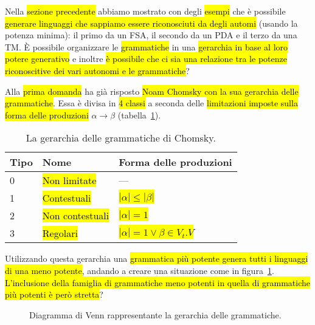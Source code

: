 \documentclass[a4paper,11pt,twoside]{article}
\theoremstyle{plain}
\theoremstyle{definition}
\theoremstyle{remark}
\begin{document}
Nella \hl{sezione precedente} abbiamo mostrato con degli \hl{esempi} che è
possibile \hl{generare linguaggi che sappiamo essere riconosciuti da degli
automi} (usando la potenza minima): il primo da un FSA, il secondo da un PDA e
il terzo da una TM\@. È possibile organizzare le \hl{grammatiche} in una
\hl{gerarchia in base al loro potere generativo} e inoltre \hl{è possibile che
ci sia una relazione tra le potenze riconoscitive dei vari autonomi e le
grammatiche}?

Alla \hl{prima domanda} ha già risposto \hl{Noam Chomsky con la sua gerarchia
delle grammatiche}. Essa è divisa in \hl{4 classi} a seconda delle
\hl{limitazioni imposte sulla forma delle produzioni} $\alpha \to \beta$
(tabella~\ref{tab:gerarchia-grammatiche}).

\begin{table}[htb]
  \centering
  \begin{tabular}{lll}
    \toprule
    Tipo & Nome            & Forma delle produzioni \\
    \midrule
    0    & \hl{Non limitate}    & --- \\
    1    & \hl{Contestuali}     & \hl{$|\alpha| \leq |\beta|$} \\
    2    & \hl{Non contestuali} & \hl{$|\alpha| = 1$} \\
    3    & \hl{Regolari}        & \hl{$|\alpha| = 1 \vee \beta \in V_t . V$} \\
    \bottomrule
  \end{tabular}
  \caption{La gerarchia delle grammatiche di Chomsky.}%
  \label{tab:gerarchia-grammatiche}
\end{table}

Utilizzando questa gerarchia una \hl{grammatica più potente genera tutti i
linguaggi di una meno potente}, andando a creare una situazione come in
figura~\ref{fig:gerarchia-grammatiche}. \hl{L'inclusione della famiglia di
grammatiche meno potenti in quella di grammatiche più potenti è però stretta}?

\begin{figure}[htb]
  \centering
  \caption{Diagramma di Venn rappresentante la gerarchia delle grammatiche.}%
  \label{fig:gerarchia-grammatiche}
\end{figure}
\end{document}
